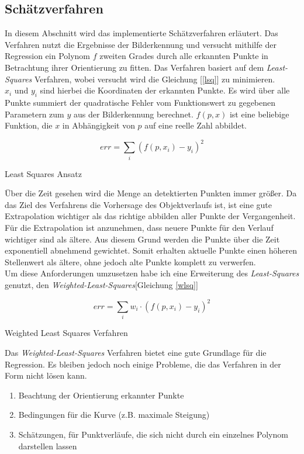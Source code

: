 \subsection{Schätzverfahren}
\label{sec_curveFit}
In diesem Abschnitt wird das implementierte Schätzverfahren erläutert. Das Verfahren nutzt die Ergebnisse der Bilderkennung und versucht mithilfe der Regression ein Polynom $f$ zweiten Grades durch alle erkannten Punkte in Betrachtung ihrer Orientierung zu fitten.
Das Verfahren basiert auf dem \textit{Least-Squares} Verfahren\cite{simon2006optimal}, wobei versucht wird die Gleichung [\ref{lsq}] zu minimieren.\\
$x_i$ und $y_i$ sind hierbei die Koordinaten der erkannten Punkte. Es wird über alle Punkte summiert der quadratische Fehler vom Funktionswert zu gegebenen Parametern zum $y$ aus der Bilderkennung berechnet. $f(p,x)$ ist eine beliebige Funktion, die $x$ in Abhängigkeit von $p$ auf eine reelle Zahl abbildet.\\
\begin{ownequation}[H]
\begin{equation}
err = \sum_{i}(f(p,x_i)-y_i)^2
\end{equation}
\caption{Least Squares Ansatz}
\label{lsq}
\end{ownequation}
Über die Zeit gesehen wird die Menge an detektierten Punkten immer größer. Da das Ziel des Verfahrens die Vorhersage des Objektverlaufs ist, ist eine gute Extrapolation wichtiger als das richtige abbilden aller Punkte der Vergangenheit. Für die Extrapolation ist anzunehmen, dass neuere Punkte für den Verlauf wichtiger sind als ältere. Aus diesem Grund werden die Punkte über die Zeit exponentiell abnehmend gewichtet. Somit erhalten aktuelle Punkte einen höheren Stellenwert als ältere, ohne jedoch alte Punkte komplett zu verwerfen.\\
Um diese Anforderungen umzusetzen habe ich eine Erweiterung des \textit{Least-Squares} genutzt, den \textit{Weighted-Least-Squares}[Gleichung \ref{wlsq}]\\
\begin{ownequation}[H]
\begin{equation}
err = \sum_{i}w_i \cdot (f(p,x_i)-y_i)^2
\end{equation}
\caption{Weighted Least Squares Verfahren}
\label{wlsq}
\end{ownequation}

Das \textit{Weighted-Least-Squares} Verfahren bietet eine gute Grundlage für die Regression. Es bleiben jedoch noch einige Probleme, die das Verfahren in der Form nicht lösen kann.
\begin{enumerate}
\item Beachtung der Orientierung erkannter Punkte
\item Bedingungen für die Kurve (z.B. maximale Steigung)
\item Schätzungen, für Punktverläufe, die sich nicht durch ein einzelnes Polynom darstellen lassen
\end{enumerate}

